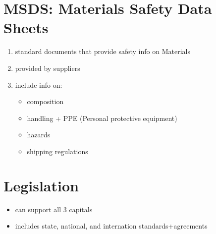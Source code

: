 \documentclass[11pt]{article}
\begin{document}
\section{MSDS: Materials Safety Data Sheets}
\begin{enumerate}
    \item standard documents that provide safety info on Materials
    \item provided by suppliers
    \item include info on:
    \begin{itemize}
        \item composition
        \item handling + PPE (Personal protective equipment)
        \item hazards
        \item shipping regulations
    \end{itemize}
\end{enumerate}
\section{Legislation}
\begin{itemize}
    \item can support all 3 capitals
    \item includes state, national, and internation standards+agreements
\end{itemize}
\end{document}
